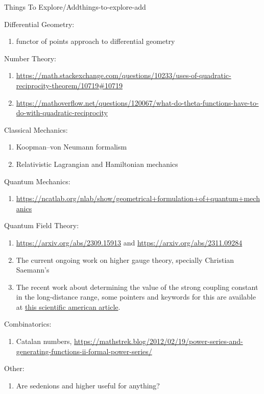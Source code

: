 \begin{remark}{Things To Explore/Add}{things-to-explore-add}
\begin{enumerate}
    \end{enumerate}
    Differential Geometry:
    \begin{enumerate}
        \item functor of points approach to differential geometry
    \end{enumerate}
    Number Theory:
    \begin{enumerate}
        \item \url{https://math.stackexchange.com/questions/10233/uses-of-quadratic-reciprocity-theorem/10719#10719}
        \item \url{https://mathoverflow.net/questions/120067/what-do-theta-functions-have-to-do-with-quadratic-reciprocity}
    \end{enumerate}
    Classical Mechanics:
    \begin{enumerate}
        \item Koopman--von Neumann formalism
        \item Relativistic Lagrangian and Hamiltonian mechanics
    \end{enumerate}
    Quantum Mechanics:
    \begin{enumerate}
        \item \url{https://ncatlab.org/nlab/show/geometrical+formulation+of+quantum+mechanics}
    \end{enumerate}
    Quantum Field Theory:
    \begin{enumerate}
        \item \url{https://arxiv.org/abs/2309.15913} and \url{https://arxiv.org/abs/2311.09284}
        \item The current ongoing work on higher gauge theory, specially Christian Saemann's
        \item The recent work about determining the value of the strong coupling constant in the long-distance range, some pointers and keywords for this are available at \href{https://www.scientificamerican.com/article/physicists-finally-know-how-the-strong-force-gets-its-strength/}{this scientific american article}.
    \end{enumerate}
    Combinatorics:
    \begin{enumerate}
        \item Catalan numbers, \url{https://mathstrek.blog/2012/02/19/power-series-and-generating-functions-ii-formal-power-series/}
    \end{enumerate}
    Other:
    \begin{enumerate}
        \item Are sedenions and higher useful for anything?

\end{enumerate}
\end{remark}
